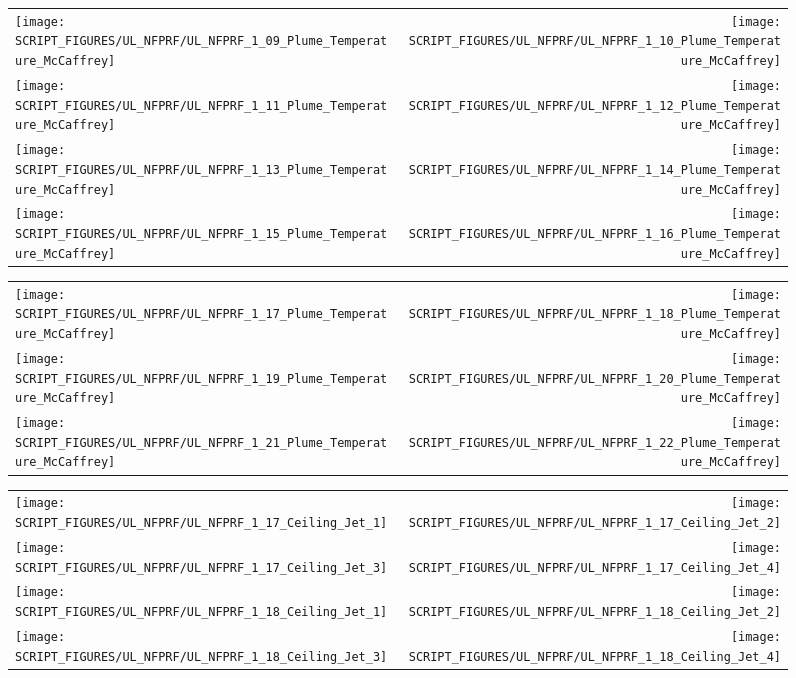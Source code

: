 \begin{figure}[!ht]
\begin{tabular*}{\textwidth}{l@{\extracolsep{\fill}}r}
\texttt{[image: SCRIPT\_FIGURES/UL\_NFPRF/UL\_NFPRF\_1\_09\_Plume\_Temperature\_McCaffrey]} &
\texttt{[image: SCRIPT\_FIGURES/UL\_NFPRF/UL\_NFPRF\_1\_10\_Plume\_Temperature\_McCaffrey]} \\
\texttt{[image: SCRIPT\_FIGURES/UL\_NFPRF/UL\_NFPRF\_1\_11\_Plume\_Temperature\_McCaffrey]} &
\texttt{[image: SCRIPT\_FIGURES/UL\_NFPRF/UL\_NFPRF\_1\_12\_Plume\_Temperature\_McCaffrey]} \\
\texttt{[image: SCRIPT\_FIGURES/UL\_NFPRF/UL\_NFPRF\_1\_13\_Plume\_Temperature\_McCaffrey]} &
\texttt{[image: SCRIPT\_FIGURES/UL\_NFPRF/UL\_NFPRF\_1\_14\_Plume\_Temperature\_McCaffrey]} \\
\texttt{[image: SCRIPT\_FIGURES/UL\_NFPRF/UL\_NFPRF\_1\_15\_Plume\_Temperature\_McCaffrey]} &
\texttt{[image: SCRIPT\_FIGURES/UL\_NFPRF/UL\_NFPRF\_1\_16\_Plume\_Temperature\_McCaffrey]}
\end{tabular*}
\end{figure}

\begin{figure}[!ht]
\begin{tabular*}{\textwidth}{l@{\extracolsep{\fill}}r}
\texttt{[image: SCRIPT\_FIGURES/UL\_NFPRF/UL\_NFPRF\_1\_17\_Plume\_Temperature\_McCaffrey]} &
\texttt{[image: SCRIPT\_FIGURES/UL\_NFPRF/UL\_NFPRF\_1\_18\_Plume\_Temperature\_McCaffrey]} \\
\texttt{[image: SCRIPT\_FIGURES/UL\_NFPRF/UL\_NFPRF\_1\_19\_Plume\_Temperature\_McCaffrey]} &
\texttt{[image: SCRIPT\_FIGURES/UL\_NFPRF/UL\_NFPRF\_1\_20\_Plume\_Temperature\_McCaffrey]} \\
\texttt{[image: SCRIPT\_FIGURES/UL\_NFPRF/UL\_NFPRF\_1\_21\_Plume\_Temperature\_McCaffrey]} &
\texttt{[image: SCRIPT\_FIGURES/UL\_NFPRF/UL\_NFPRF\_1\_22\_Plume\_Temperature\_McCaffrey]}
\end{tabular*}
\end{figure}

\begin{figure}[!ht]
\begin{tabular*}{\textwidth}{l@{\extracolsep{\fill}}r}
\texttt{[image: SCRIPT\_FIGURES/UL\_NFPRF/UL\_NFPRF\_1\_17\_Ceiling\_Jet\_1]} &
\texttt{[image: SCRIPT\_FIGURES/UL\_NFPRF/UL\_NFPRF\_1\_17\_Ceiling\_Jet\_2]} \\
\texttt{[image: SCRIPT\_FIGURES/UL\_NFPRF/UL\_NFPRF\_1\_17\_Ceiling\_Jet\_3]} &
\texttt{[image: SCRIPT\_FIGURES/UL\_NFPRF/UL\_NFPRF\_1\_17\_Ceiling\_Jet\_4]} \\
\texttt{[image: SCRIPT\_FIGURES/UL\_NFPRF/UL\_NFPRF\_1\_18\_Ceiling\_Jet\_1]} &
\texttt{[image: SCRIPT\_FIGURES/UL\_NFPRF/UL\_NFPRF\_1\_18\_Ceiling\_Jet\_2]} \\
\texttt{[image: SCRIPT\_FIGURES/UL\_NFPRF/UL\_NFPRF\_1\_18\_Ceiling\_Jet\_3]} &
\texttt{[image: SCRIPT\_FIGURES/UL\_NFPRF/UL\_NFPRF\_1\_18\_Ceiling\_Jet\_4]}
\end{tabular*}
\end{figure}

